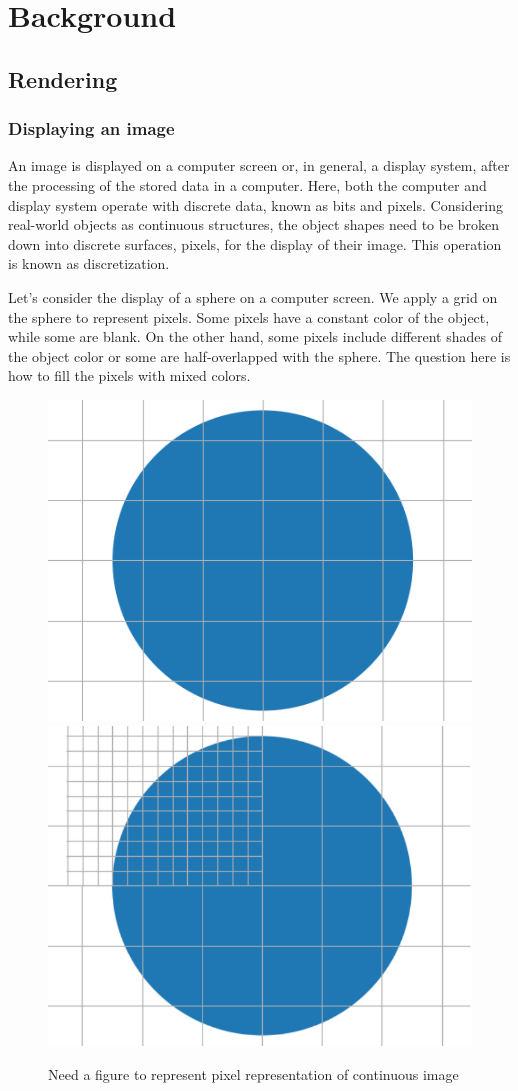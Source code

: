 \chapter{Background}

\section{Rendering}
\subsection{Displaying an image}
An image is displayed on a computer screen or, in general, a display system, after the processing of the stored data in a computer. Here, both the computer and display system operate with discrete data, known as bits and pixels. Considering real-world objects as continuous structures, the object shapes need to be broken down into discrete surfaces, pixels, for the display of their image. This operation is known as discretization. 

Let's consider the display of a sphere on a computer screen. We apply a grid on the sphere to represent pixels. Some pixels have a constant color of the object, while some are blank. On the other hand, some pixels include different shades of the object color or some are half-overlapped with the sphere. The question here is how to fill the pixels with mixed colors. 

\begin{figure}
  \centering
   \includegraphics[width=0.4\linewidth]{Images/grid_circle.png}
    \includegraphics[width=0.4\linewidth]{Images/merged_grid_circle2-crop.pdf}

   \caption{Need a figure to represent pixel representation of continuous image}
   \label{fig:display-grid}
\end{figure}



